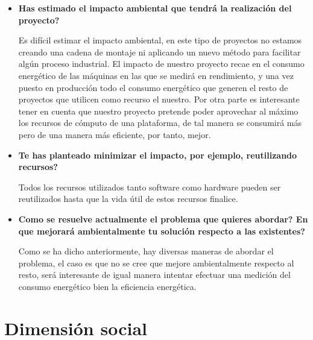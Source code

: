 \begin{itemize}
 \item \textbf{Has estimado el impacto ambiental que tendrá la realización del proyecto?}\newline
 
 Es difícil estimar el impacto ambiental, en este tipo de proyectos no estamos creando una cadena de montaje ni aplicando un nuevo método para facilitar algún proceso industrial. El impacto de nuestro proyecto recae en el consumo energético de las máquinas en las que se medirá en rendimiento, y una vez puesto en producción todo el consumo energético que generen el resto de proyectos que utilicen como recurso el nuestro. Por otra parte es interesante tener en cuenta que nuestro proyecto pretende poder aprovechar al máximo los recursos de cómputo de una plataforma, de tal manera se consumirá más pero de una manera más eficiente, por tanto, mejor.
 
 \item \textbf{Te has planteado minimizar el impacto, por ejemplo, reutilizando recursos?}\newline
 
 Todos los recursos utilizados tanto software como hardware pueden ser reutilizados hasta que la vida útil de estos recursos finalice.
 
 \item \textbf{Como se resuelve actualmente el problema que quieres abordar? En que mejorará ambientalmente tu solución respecto a las existentes?}\newline
 
Como se ha dicho anteriormente, hay diversas maneras de abordar el problema, el caso es que no se cree que mejore ambientalmente respecto al resto, será interesante de igual manera intentar efectuar una medición del consumo energético  bien la eficiencia energética.
\end{itemize}

\section{Dimensión social}

